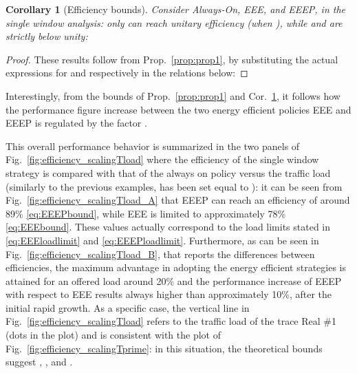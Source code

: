 \documentclass[journal,10pt,twoside,final]{IEEEtran}
\newtheorem{corollary}{Corollary}
\begin{document}
\begin{corollary} [Efficiency bounds] Consider Always-On, EEE, and EEEP, in the single window analysis: only  can reach unitary efficiency (when ), while  and  are strictly below unity:


\label{prop:cor1}
\end{corollary}
\begin{proof}
These results follow from Prop.~\ref{prop:prop1}, by substituting the actual expressions for  and  respectively in the relations below:


\end{proof}


Interestingly, from the bounds of Prop.~\ref{prop:prop1} and Cor.~\ref{prop:cor1}, it follows how the performance figure increase between the two energy efficient policies EEE and EEEP is regulated by the factor .

This overall performance behavior is summarized in the two panels of Fig.~\ref{fig:efficiency_scalingTload} where the efficiency of the single window strategy is compared with that of the always on policy versus the traffic load (similarly to the previous examples,  has been set equal to ): it can be seen from Fig.~\ref{fig:efficiency_scalingTload_A} that EEEP can reach an efficiency of around 89\% \eqref{eq:EEEPbound}, while EEE is limited to approximately 78\% \eqref{eq:EEEbound}.
These values actually correspond to the load limits stated in \eqref{eq:EEEloadlimit} and \eqref{eq:EEEPloadlimit}.
Furthermore, as can be seen in Fig.~\ref{fig:efficiency_scalingTload_B}, that reports the differences between efficiencies, the maximum advantage in adopting the energy efficient strategies is attained for an offered load around 20\% and the performance increase of EEEP with respect to EEE results always higher than approximately 10\%, after the initial rapid growth. As a specific case, the vertical line in Fig.~\ref{fig:efficiency_scalingTload} refers to the traffic load of the trace Real \#1 (dots in the plot) and is consistent with the plot of Fig.~\ref{fig:efficiency_scalingTprime}: in this situation, the theoretical bounds suggest , , and . 
\begin{figure*}[ht!]
\centering
{}
\hspace{1cm}
\vspace{-0.0cm}
\caption{Efficiency comparison of single strategies. The plots are shown as a function of the network load. The two dashed lines refer to the single EEE and EEEP strategies, whereas the solid line corresponds to the Always-On policy. The vertical gray line refers specifically to the trace Real \#1.}
\label{fig:efficiency_scalingTload}
\end{figure*}
\end{document}
